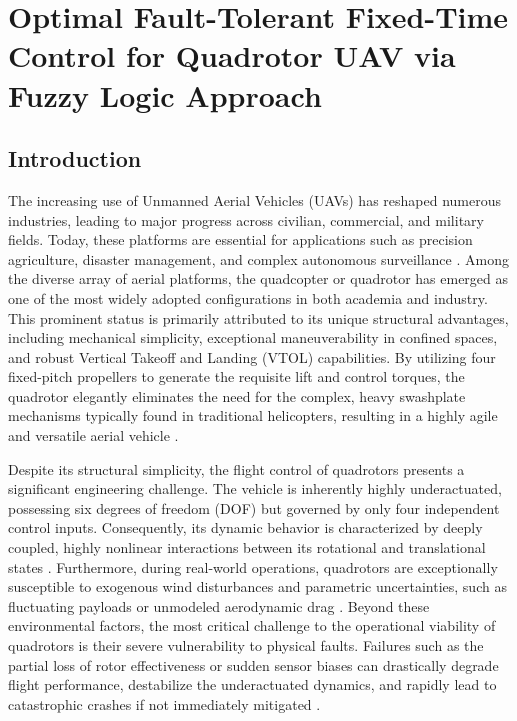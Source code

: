 \chapter{Optimal Fault-Tolerant Fixed-Time Control for Quadrotor UAV via Fuzzy Logic Approach}

\section{Introduction}
\label{sec:intro_ch4}

The increasing use of Unmanned Aerial Vehicles (UAVs) has reshaped numerous industries, leading to major progress across civilian, commercial, and military fields. Today, these platforms are essential for applications such as precision agriculture, disaster management, and complex autonomous surveillance \cite{UAV_rev, UAV_rev1, Ghamry2017}. Among the diverse array of aerial platforms, the quadcopter or quadrotor has emerged as one of the most widely adopted configurations in both academia and industry.  This prominent status is primarily attributed to its unique structural advantages, including mechanical simplicity, exceptional maneuverability in confined spaces, and robust Vertical Takeoff and Landing (VTOL) capabilities. By utilizing four fixed-pitch propellers to generate the requisite lift and control torques, the quadrotor elegantly eliminates the need for the complex, heavy swashplate mechanisms typically found in traditional helicopters, resulting in a highly agile and versatile aerial vehicle \cite{Bouabdallah2007}.

Despite its structural simplicity, the flight control of quadrotors presents a significant engineering challenge. The vehicle is inherently highly underactuated, possessing six degrees of freedom (DOF) but governed by only four independent control inputs. Consequently, its dynamic behavior is characterized by deeply coupled, highly nonlinear interactions between its rotational and translational states \cite{Underactuation1, RigidBody}. Furthermore, during real-world operations, quadrotors are exceptionally susceptible to exogenous wind disturbances and parametric uncertainties, such as fluctuating payloads or unmodeled aerodynamic drag \cite{ExternalDisturbances2}. Beyond these environmental factors, the most critical challenge to the operational viability of quadrotors is their severe vulnerability to physical faults. Failures such as the partial loss of rotor effectiveness or sudden sensor biases can drastically degrade flight performance, destabilize the underactuated dynamics, and rapidly lead to catastrophic crashes if not immediately mitigated \cite{Liu2022, Scognamiglio2024}.

